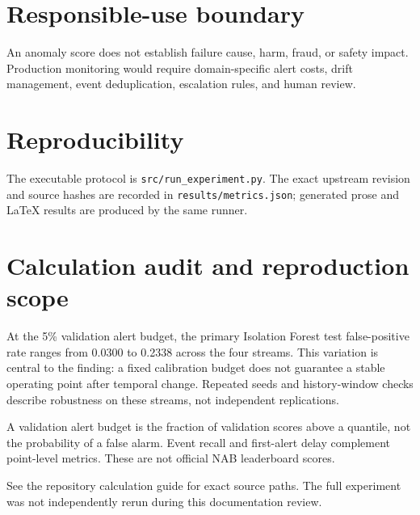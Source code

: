 \documentclass[11pt]{article}
\begin{document}
\section{Responsible-use boundary}
An anomaly score does not establish failure cause, harm, fraud, or safety impact. Production monitoring would require domain-specific alert costs, drift management, event deduplication, escalation rules, and human review.

\section{Reproducibility}
The executable protocol is \texttt{src/run\_experiment.py}. The exact upstream revision and source hashes are recorded in \texttt{results/metrics.json}; generated prose and LaTeX results are produced by the same runner.



\section{Calculation audit and reproduction scope}
At the 5\% validation alert budget, the primary Isolation Forest test false-positive rate ranges from 0.0300 to 0.2338 across the four streams. This variation is central to the finding: a fixed calibration budget does not guarantee a stable operating point after temporal change. Repeated seeds and history-window checks describe robustness on these streams, not independent replications.

A validation alert budget is the fraction of validation scores above a quantile, not the probability of a false alarm. Event recall and first-alert delay complement point-level metrics. These are not official NAB leaderboard scores.

See the repository calculation guide for exact source paths. The full experiment was not independently rerun during this documentation review.
\end{document}
